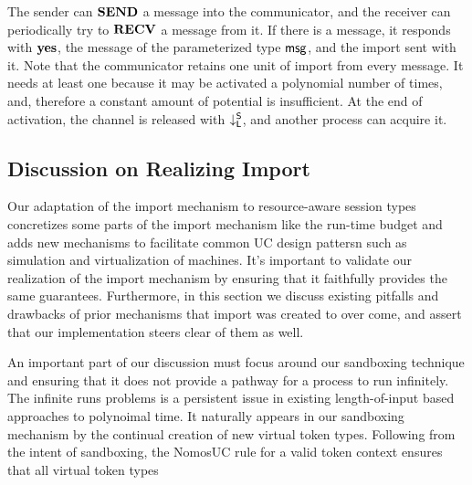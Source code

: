 The sender can $\mathbf{SEND}$ a message into the communicator, and the receiver can periodically try to $\mathbf{RECV}$ a message from it.
If there is a message, it responds with $\mathbf{yes}$, the message of the parameterized type $\mathsf{msg}$, and the import sent with it.
Note that the communicator retains one unit of import from every message. 
It needs at least one because it may be activated a polynomial number of times, and, therefore a constant amount of potential is insufficient. 
At the end of activation, the channel is released with $\downarrow^{\mathsf{S}}_{\mathsf{L}}$, and another process can acquire it.

\subsection{Discussion on Realizing Import}
Our adaptation of the import mechanism to resource-aware session types concretizes some parts of the import mechanism like the run-time budget and adds new mechanisms
to facilitate common UC design pattersn such as simulation and virtualization of machines. 
It's important to validate our realization of the import mechanism by ensuring that it faithfully provides the same guarantees.
Furthermore, in this section we discuss existing pitfalls and drawbacks of prior mechanisms that import was created to over come, and assert that our implementation steers clear of them as well.

An important part of our discussion must focus around our sandboxing technique and ensuring that it does not provide a pathway for a process to run infinitely.
The infinite runs problems is a persistent issue in existing length-of-input based approaches to polynoimal time.
It naturally appears in our sandboxing mechanism by the continual creation of new virtual token types. Following from the intent of sandboxing, the NomosUC rule for a valid token context ensures that all virtual token types  

